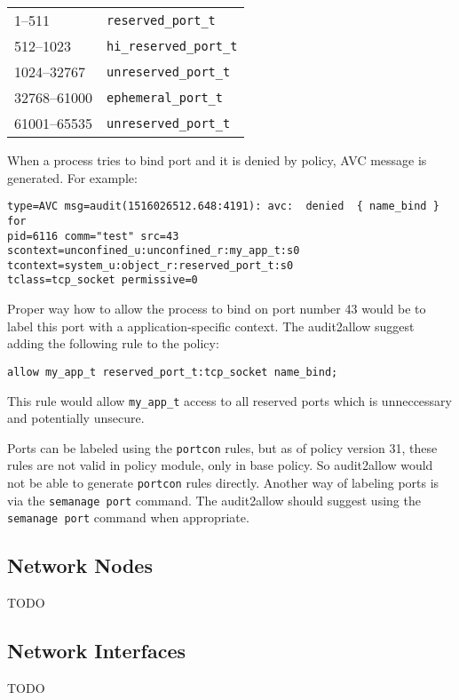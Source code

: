 \begin{tabular}{l l}
    1--511 & \texttt{reserved\_port\_t} \\
    512--1023 & \texttt{hi\_reserved\_port\_t} \\
    1024--32767 & \texttt{unreserved\_port\_t} \\
    32768--61000 & \texttt{ephemeral\_port\_t} \\
    61001--65535 & \texttt{unreserved\_port\_t} \\
\end{tabular}

When a process tries to bind port and it is denied by policy, AVC message is
generated. For example:
\begin{lstlisting}
type=AVC msg=audit(1516026512.648:4191): avc:  denied  { name_bind } for
pid=6116 comm="test" src=43 scontext=unconfined_u:unconfined_r:my_app_t:s0
tcontext=system_u:object_r:reserved_port_t:s0
tclass=tcp_socket permissive=0
\end{lstlisting}

Proper way how to allow the process to bind on port number 43 would be to label
this port with a application-specific context. The audit2allow suggest adding
the following rule to the policy:
\begin{lstlisting}
allow my_app_t reserved_port_t:tcp_socket name_bind;
\end{lstlisting}
This rule would allow \texttt{my\_app\_t} access to all reserved ports which is
unneccessary and potentially unsecure.

Ports can be labeled using the \texttt{portcon} rules, but as of policy version
31, these rules are not valid in policy module, only in base policy. So
audit2allow would not be able to generate \texttt{portcon} rules directly.
Another way of labeling ports is via the \texttt{semanage port} command. The
audit2allow should suggest using the \texttt{semanage port} command when
appropriate.

\subsection{Network Nodes}
TODO

\subsection{Network Interfaces}
TODO

